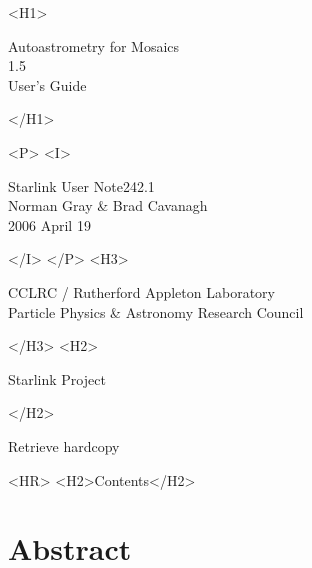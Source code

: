 \documentclass[twoside,11pt]{article}
\newcommand{\stardoccategory}  {Starlink User Note}
\newcommand{\stardocsource}    {sun242.1}
\newcommand{\stardocnumber}    {242.1}
\newcommand{\stardocauthors}   {Norman Gray \& Brad Cavanagh}
\newcommand{\stardocdate}      {2006 April 19}
\newcommand{\stardoctitle}     {Autoastrometry for Mosaics}
\newcommand{\stardocversion}   {1.5}
\newcommand{\stardocmanual}    {User's Guide}
\newcommand{\htmladdnormallink}[2]{#1}
\newcommand{\htmladdimg}[1]{}
\newcommand{\htmlref}[2]{#1}
\newcommand{\htmladdtonavigation}[1]{}
\newcommand{\xlabel}[1]{}
\newcommand{\latexonlytoc}[0]{\tableofcontents}
\begin{document}
\begin{htmlonly}
   \xlabel{}
   \begin{rawhtml} <H1> \end{rawhtml}
      \stardoctitle\\
      \stardocversion\\
      \stardocmanual
   \begin{rawhtml} </H1> \end{rawhtml}


   \begin{rawhtml} <P> <I> \end{rawhtml}
   \stardoccategory \stardocnumber \\
   \stardocauthors \\
   \stardocdate
   \begin{rawhtml} </I> </P> <H3> \end{rawhtml}
      \htmladdnormallink{CCLRC}{http://www.cclrc.ac.uk} /
      \htmladdnormallink{Rutherford Appleton Laboratory}
                        {http://www.cclrc.ac.uk/ral} \\
      \htmladdnormallink{Particle Physics \& Astronomy Research Council}
                        {http://www.pparc.ac.uk} \\
   \begin{rawhtml} </H3> <H2> \end{rawhtml}
      \htmladdnormallink{Starlink Project}{http://www.starlink.ac.uk/}
   \begin{rawhtml} </H2> \end{rawhtml}
   \htmladdnormallink{\htmladdimg{source.gif} Retrieve hardcopy}
      {http://www.starlink.ac.uk/cgi-bin/hcserver?\stardocsource}\\

  \label{stardoccontents}
  \begin{rawhtml}
    <HR>
    <H2>Contents</H2>
  \end{rawhtml}
  \renewcommand{\latexonlytoc}[0]{}
  \htmladdtonavigation{\htmlref{\htmladdimg{contents_motif.gif}}
        {stardoccontents}}

  \section{\xlabel{abstract}Abstract}
\end{htmlonly}
\end{document}
